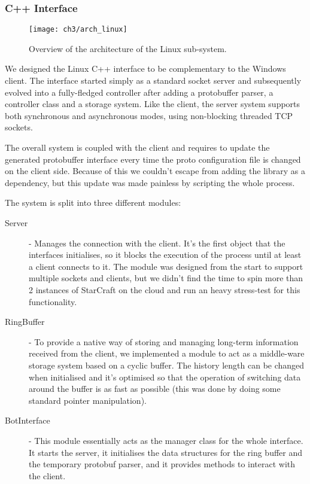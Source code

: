 \subsubsection{C++ Interface}

\begin{figure}[h]
    \centering
    \texttt{[image: ch3/arch\_linux]}
    \caption{Overview of the architecture of the Linux sub-system.}
    \label{fig:arch_linux}
\end{figure}

We designed the Linux C++ interface to be complementary to the Windows client.
The interface started simply as a standard socket server and subsequently
evolved into a fully-fledged controller after adding a protobuffer parser, a
controller class and a storage system. Like the client, the server system
supports both synchronous and asynchronous modes, using non-blocking threaded
TCP sockets.

The overall system is coupled with the client and requires to update the
generated protobuffer interface every time the proto configuration file is
changed on the client side. Because of this we couldn't escape from adding the
library as a dependency, but this update was made painless by scripting the
whole process.

The system is split into three different modules:
\begin{description}
\item [Server] - Manages the connection with the client. It's the first object
  that the interfaces initialises, so it blocks the execution of the process
  until at least a client connects to it. The module was designed from the start
  to support multiple sockets and clients, but we didn't find the time to spin
  more than 2 instances of StarCraft on the cloud and run an heavy stress-test
  for this functionality.
\item [RingBuffer] - To provide a native way of storing and managing long-term
  information received from the client, we implemented a module to act as a
  middle-ware storage system based on a cyclic buffer. The history length can be
  changed when initialised and it's optimised so that the operation of switching
  data around the buffer is as fast as possible (this was done by doing some
  standard pointer manipulation).
\item [BotInterface] - This module essentially acts as the manager class for the
  whole interface. It starts the server, it initialises the data structures for
  the ring buffer and the temporary protobuf parser, and it provides methods to
  interact with the client.
\end{description}

